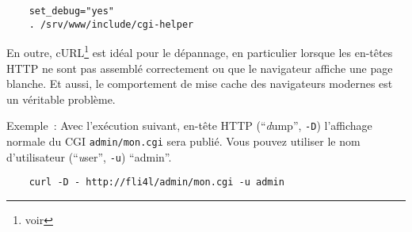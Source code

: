 \begin{example}
\begin{verbatim}
    set_debug="yes"
    . /srv/www/include/cgi-helper
\end{verbatim}
\end{example}

En outre, cURL\footnote{voir } est
idéal pour le dépannage, en particulier lorsque les en-têtes HTTP ne sont pas
assemblé correctement ou que le navigateur affiche une page blanche. Et aussi,
le comportement de mise cache des navigateurs modernes est un véritable problème.

Exemple~: Avec l'exécution suivant, en-tête HTTP ("`\emph{d}ump"', \texttt{-D})
l'affichage normale du CGI \texttt{admin/mon.cgi} sera publié. Vous pouvez utiliser
le nom d'utilisateur ("`\emph{u}ser"', \texttt{-u}) "`admin"'.

\begin{example}
\begin{verbatim}
    curl -D - http://fli4l/admin/mon.cgi -u admin
\end{verbatim}
\end{example}
